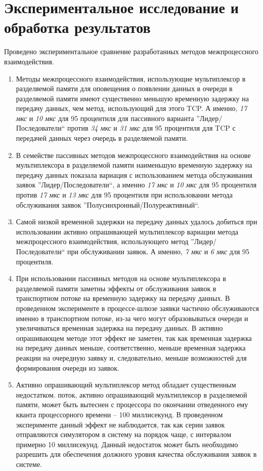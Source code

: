 \chapter{Экспериментальное исследование и обработка результатов}\label{chapter41}





\chapterconclusion

Проведено экспериментальное сравнение разработанных методов межпроцессного взаимодействия.
\begin{enumerate}
\item Методы межпроцессного взаимодействия, использующие мультиплексор в разделяемой памяти для оповещения о появлении данных в очереди в разделяемой памяти имеют существенно меньшую временную задержку на передачу данных, чем метод, использующий для этого TCP. А именно, \textit{17 мкс} и \textit{10 мкс} для 95 процентиля для пассивного варианта ''Лидер/Последователи`` против \textit{34 мкс} и \textit{31 мкс} для 95 процентиля для TCP с передачей данных через очередь в разделяемой памяти.
\item В семействе пассивных методов межпроцессного взаимодействия на основе мультиплексора в разделяемой памяти наименьшую временную задержку на передачу данных показала вариация с использованием метода обслуживания заявок ''Лидер/Последователи``, а именно \textit{17 мкс} и \textit{10 мкс} для 95 процентиля против \textit{17 мкс} и \textit{13 мкс} для 95 процентиля при использовании метода обслуживания заявок ''Полусинхронный/Полуреактивный``.
\item Самой низкой временной задержки на передачу данных удалось добиться при использовании активно опрашивающей мультиплексор вариации метода межпроцессного взаимодействия, использующего метод ''Лидер/Последователи`` при обслуживании заявок. А именно, \textit{7 мкс} и \textit{6 мкс} для 95 процентиля.
\item При использовании пассивных методов на основе мультиплексора в разделяемой памяти заметны эффекты от обслуживания заявок в транспортном потоке на временную задержку на передачу данных. В проведенном эксперименте в процессе-шлюзе заявки частично обслуживаются именно в транспортном потоке, из-за чего могут образовываться очереди и увеличиваться временная задержка на передачу данных. В активно опрашивающем методе этот эффект не заметен, так как временная задержка на передачу данных меньше, соответственно, меньше временная задержка реакции на очередную заявку и, следовательно, меньше возможностей для формирования очереди из заявок.
\item Активно опрашивающий мультиплексор метод обладает существенным недостатком. поток, активно опрашивающий мультиплексор в разделяемой памяти, может быть вытеснен с процессора по окончании отведенного ему кванта процессорного времени -- 100 миллисекунд. В проведенном эксперименте данный эффект не наблюдается, так как серии заявок отправляются симулятором в систему на порядок чаще, с интервалом примерно 10 миллисекунд. Данный недостаток может быть необходимо разрешить для обеспечения должного уровня качества обслуживания заявок в системе.
\end{enumerate}